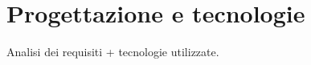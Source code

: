 \chapter{Progettazione e tecnologie}\label{chap:Progetto}
Analisi dei requisiti + tecnologie utilizzate.


